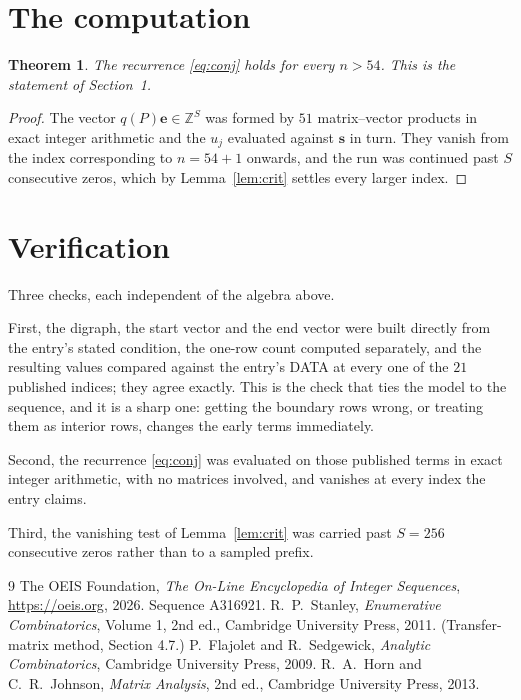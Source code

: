\documentclass[11pt,a4paper]{article}
\theoremstyle{plain}
\newtheorem{theorem}{Theorem}
\theoremstyle{definition}
\begin{document}
\section{The computation}

\begin{theorem}
The recurrence \eqref{eq:conj} holds for every $n>54$. This is the statement of
Section~1.
\end{theorem}

\begin{proof}
The vector $q(P)\mathbf{e}\in\mathbb{Z}^{S}$ was formed by $51$ matrix--vector
products in exact integer arithmetic and the $u_j$ evaluated against $\mathbf{s}$ in turn.
They vanish from the index corresponding to $n=54+1$ onwards, and the run was continued
past $S$ consecutive zeros, which by Lemma~\ref{lem:crit} settles every larger index.
\end{proof}

\section{Verification}

Three checks, each independent of the algebra above.

First, the digraph, the start vector and the end vector were built directly from the
entry's stated condition, the one-row count computed separately, and the resulting values
compared against the entry's DATA at every one of the $21$ published indices; they
agree exactly. This is the check that ties the model to the sequence, and it is a sharp one:
getting the boundary rows wrong, or treating them as interior rows, changes the early terms
immediately.

Second, the recurrence \eqref{eq:conj} was evaluated on those published terms in exact
integer arithmetic, with no matrices involved, and vanishes at every index the entry claims.

Third, the vanishing test of Lemma~\ref{lem:crit} was carried past $S=256$ consecutive
zeros rather than to a sampled prefix.

\begin{thebibliography}{9}
 The OEIS Foundation, \emph{The On-Line Encyclopedia of Integer
Sequences}, \url{https://oeis.org}, 2026. Sequence A316921.
 R.~P.~Stanley, \emph{Enumerative Combinatorics}, Volume 1, 2nd ed.,
Cambridge University Press, 2011. (Transfer-matrix method, Section 4.7.)
 P.~Flajolet and R.~Sedgewick, \emph{Analytic Combinatorics}, Cambridge
University Press, 2009.
 R.~A.~Horn and C.~R.~Johnson, \emph{Matrix Analysis}, 2nd ed., Cambridge
University Press, 2013.
\end{thebibliography}
\end{document}
